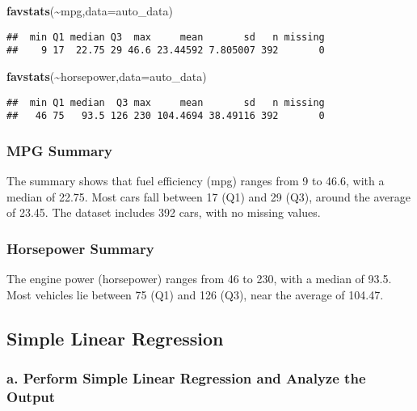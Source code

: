 \documentclass[
]{article}
\newenvironment{Shaded}{\begin{snugshade}}{\end{snugshade}}
\newcommand{\AttributeTok}[1]{\textcolor[rgb]{0.13,0.29,0.53}{#1}}
\newcommand{\FunctionTok}[1]{\textcolor[rgb]{0.13,0.29,0.53}{\textbf{#1}}}
\newcommand{\NormalTok}[1]{#1}
\newcommand{\SpecialCharTok}[1]{\textcolor[rgb]{0.81,0.36,0.00}{\textbf{#1}}}
\begin{document}
\begin{Shaded}
\begin{Highlighting}[]
\FunctionTok{favstats}\NormalTok{(}\SpecialCharTok{\textasciitilde{}}\NormalTok{mpg,}\AttributeTok{data=}\NormalTok{auto\_data)}
\end{Highlighting}
\end{Shaded}

\begin{verbatim}
##  min Q1 median Q3  max     mean       sd   n missing
##    9 17  22.75 29 46.6 23.44592 7.805007 392       0
\end{verbatim}

\begin{Shaded}
\begin{Highlighting}[]
\FunctionTok{favstats}\NormalTok{(}\SpecialCharTok{\textasciitilde{}}\NormalTok{horsepower,}\AttributeTok{data=}\NormalTok{auto\_data)}
\end{Highlighting}
\end{Shaded}

\begin{verbatim}
##  min Q1 median  Q3 max     mean       sd   n missing
##   46 75   93.5 126 230 104.4694 38.49116 392       0
\end{verbatim}

\subsubsection{MPG Summary}\label{mpg-summary}

The summary shows that fuel efficiency (mpg) ranges from 9 to 46.6, with
a median of 22.75. Most cars fall between 17 (Q1) and 29 (Q3), around
the average of 23.45. The dataset includes 392 cars, with no missing
values.

\subsubsection{Horsepower Summary}\label{horsepower-summary}

The engine power (horsepower) ranges from 46 to 230, with a median of
93.5. Most vehicles lie between 75 (Q1) and 126 (Q3), near the average
of 104.47.

\subsection{Simple Linear Regression}\label{simple-linear-regression}

\subsubsection{a. Perform Simple Linear Regression and Analyze the
Output}\label{a.-perform-simple-linear-regression-and-analyze-the-output}
\end{document}
